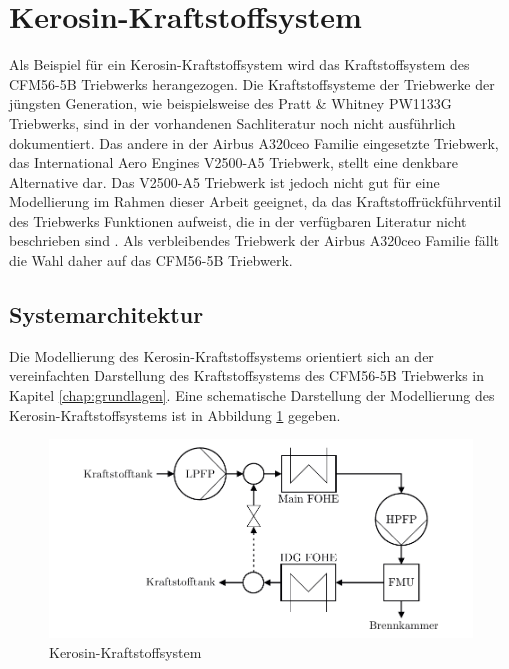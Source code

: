 \section{Kerosin-Kraftstoffsystem}

Als Beispiel für ein Kerosin-Kraftstoffsystem wird das Kraftstoffsystem des CFM56-5B Triebwerks herangezogen. Die Kraftstoffsysteme der Triebwerke der jüngsten Generation, wie beispielsweise des Pratt \& Whitney PW1133G Triebwerks, sind in der vorhandenen Sachliteratur noch nicht ausführlich dokumentiert. Das andere in der Airbus A320ceo Familie eingesetzte Triebwerk, das International Aero Engines V2500-A5 Triebwerk, stellt eine denkbare Alternative dar. Das V2500-A5 Triebwerk ist jedoch nicht gut für eine Modellierung im Rahmen dieser Arbeit geeignet, da das Kraftstoffrückführventil des Triebwerks Funktionen aufweist, die in der verfügbaren Literatur nicht beschrieben sind \cite{LinkeDiesinger.2014}. Als verbleibendes Triebwerk der Airbus A320ceo Familie fällt die Wahl daher auf das CFM56-5B Triebwerk. 

\subsection{Systemarchitektur}

Die Modellierung des Kerosin-Kraftstoffsystems orientiert sich an der vereinfachten Darstellung des Kraftstoffsystems des CFM56-5B Triebwerks in Kapitel \ref{chap:grundlagen}. Eine schematische Darstellung der Modellierung des Kerosin-Kraftstoffsystems ist in Abbildung \ref{fig:Referenz} gegeben.

\begin{figure}[ht]
\centering
\includegraphics[width=1\linewidth]{4_Abbildungen/2_Hauptteil/Kraftstoffsystem Abbildungen/Referenz.pdf}
  \caption{Kerosin-Kraftstoffsystem}
  \label{fig:Referenz}
\end{figure}
\FloatBarrier 

